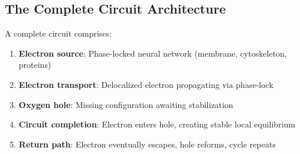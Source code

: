 \subsection{The Complete Circuit Architecture}

\begin{theorem}
\label{thm:complete_circuit}
A complete circuit comprises:
\begin{enumerate}
\item \textbf{Electron source}: Phase-locked neural network (membrane, cytoskeleton, proteins)
\item \textbf{Electron transport}: Delocalized electron propagating via phase-lock
\item \textbf{Oxygen hole}: Missing  configuration awaiting stabilization
\item \textbf{Circuit completion}: Electron enters hole, creating stable local equilibrium
\item \textbf{Return path}: Electron eventually escapes, hole reforms, cycle repeats
\end{enumerate}
\end{theorem}

